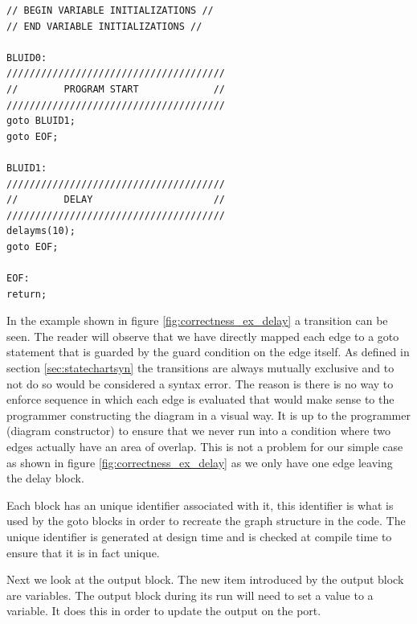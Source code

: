 \begin{minipage}{\textwidth}
\begin{lstlisting}[frame=single]
// BEGIN VARIABLE INITIALIZATIONS //
// END VARIABLE INITIALIZATIONS //

BLUID0:
//////////////////////////////////////
//        PROGRAM START             //
//////////////////////////////////////
goto BLUID1;
goto EOF;

BLUID1:
//////////////////////////////////////
//        DELAY                     //
//////////////////////////////////////
delayms(10);
goto EOF;

EOF:
return;
\end{lstlisting}
\end{minipage}

In the example shown in figure \ref{fig:correctness_ex_delay} a transition can be seen. The reader will observe that we have directly mapped each edge to a goto statement that is guarded by the guard condition on the edge itself. As defined in section \ref{sec:statechartsyn} the transitions are always mutually exclusive and to not do so would be considered a syntax error. The reason is there is no way to enforce sequence in which each edge is evaluated that would make sense to the programmer constructing the diagram in a visual way. It is up to the programmer (diagram constructor) to ensure that we never run into a condition where two edges actually have an area of overlap. This is not a problem for our simple case as shown in figure \ref{fig:correctness_ex_delay} as we only have one edge leaving the delay block.

Each block has an unique identifier associated with it, this identifier is what is used by the goto blocks in order to recreate the graph structure in the code. The unique identifier is generated at design time and is checked at compile time to ensure that it is in fact unique.

Next we look at the output block. The new item introduced by the output block are variables. The output block during its run will need to set a value to a variable. It does this in order to update the output on the port. 

